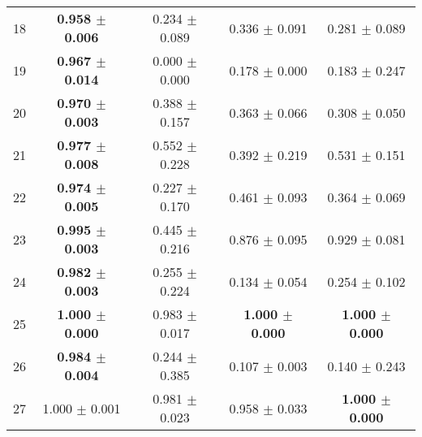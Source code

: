 \begin{table}[!ht]
{\begin{tabular}{r c c c c}
18 & \textbf{0.958 $\pm$ 0.006} & 0.234 $\pm$ 0.089 & 0.336 $\pm$ 0.091 & 0.281 $\pm$ 0.089 \\
19 & \textbf{0.967 $\pm$ 0.014} & 0.000 $\pm$ 0.000 & 0.178 $\pm$ 0.000 & 0.183 $\pm$ 0.247 \\
20 & \textbf{0.970 $\pm$ 0.003} & 0.388 $\pm$ 0.157 & 0.363 $\pm$ 0.066 & 0.308 $\pm$ 0.050 \\
21 & \textbf{0.977 $\pm$ 0.008} & 0.552 $\pm$ 0.228 & 0.392 $\pm$ 0.219 & 0.531 $\pm$ 0.151 \\
22 & \textbf{0.974 $\pm$ 0.005} & 0.227 $\pm$ 0.170 & 0.461 $\pm$ 0.093 & 0.364 $\pm$ 0.069 \\
23 & \textbf{0.995 $\pm$ 0.003} & 0.445 $\pm$ 0.216 & 0.876 $\pm$ 0.095 & 0.929 $\pm$ 0.081 \\
24 & \textbf{0.982 $\pm$ 0.003} & 0.255 $\pm$ 0.224 & 0.134 $\pm$ 0.054 & 0.254 $\pm$ 0.102 \\
25 & \textbf{1.000 $\pm$ 0.000} & 0.983 $\pm$ 0.017 & \textbf{1.000 $\pm$ 0.000} & \textbf{1.000 $\pm$ 0.000} \\
26 & \textbf{0.984 $\pm$ 0.004} & 0.244 $\pm$ 0.385 & 0.107 $\pm$ 0.003 & 0.140 $\pm$ 0.243 \\
27 & 1.000 $\pm$ 0.001 & 0.981 $\pm$ 0.023 & 0.958 $\pm$ 0.033 & \textbf{1.000 $\pm$ 0.000} \\
\end{tabular}}
\end{table}
